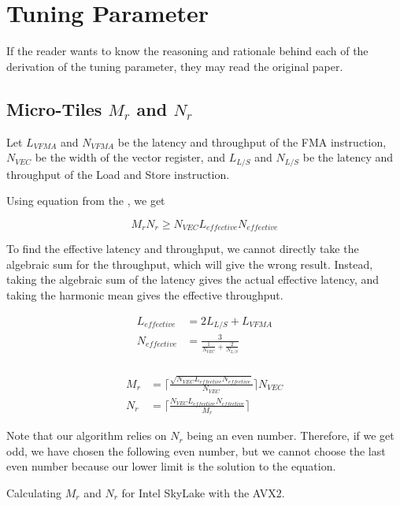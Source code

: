 \section{Tuning Parameter}

If the reader wants to know the reasoning and rationale 
behind each of the derivation of the tuning parameter, 
they may read the original \cite{BLIS} paper.

\subsection{Micro-Tiles $M_r$ and $N_r$}
\label{sec:mr_nr_calculation}

Let $L_{VFMA}$ and $N_{VFMA}$ be the latency and throughput of the FMA instruction, 
$N_{VEC}$ be the width of the vector register, and
$L_{L/S}$ and $N_{L/S}$ be the latency and throughput of 
the Load and Store instruction.

Using equation from the \cite{BLIS}, we get

\begin{equation}
    M_rN_r \geq N_{VEC} L_{effective} N_{effective}
\end{equation}

To find the effective latency and throughput, we cannot directly take the 
algebraic sum for the throughput, which will give the wrong result. Instead, taking the 
algebraic sum of the latency gives the actual effective latency, 
and taking the harmonic mean gives the effective throughput.

\begin{align*}
    L_{effective} &= 2L_{L/S} + L_{VFMA}\\
    N_{effective} &= \frac{3}{ \frac{1}{N_{VEC}} + \frac{2}{N_{L/S}} } \\
\end{align*}

\begin{align*}
    M_r &= \lceil \frac{ \sqrt{N_{VEC} L_{effective} N_{effective}} }{N_{VEC}} \rceil N_{VEC} \\
    N_r &= \lceil \frac{ N_{VEC} L_{effective} N_{effective} }{M_r} \rceil
\end{align*}

Note that our algorithm relies on $N_r$ being an even number.  
Therefore, if we get odd, we have chosen the following even number, 
but we cannot choose the last even number because our lower limit 
is the solution to the equation.

Calculating $M_r$ and $N_r$ for Intel SkyLake with the AVX2.

